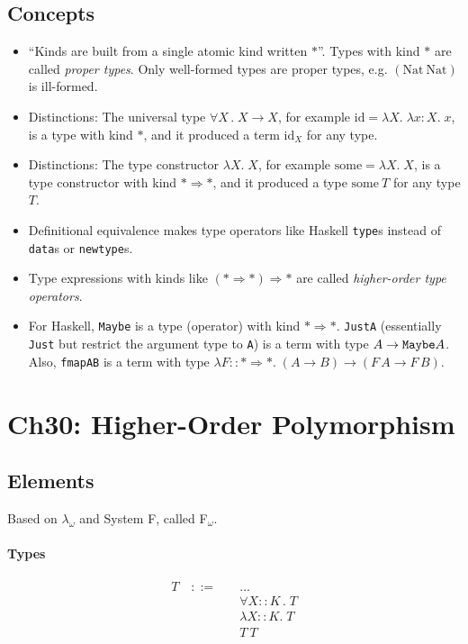 \documentclass{article}
\newcommand{\lam}[2]{\lambda #1 .\;#2}
\newcommand{\lamt}[3]{\lambda #1: #2 .\;#3}
\newcommand{\lamk}[3]{\lambda #1 :: #2 .\;#3}
\newcommand{\uquant}[2]{\forall #1 \, .\; #2}
\begin{document}
\subsection{Concepts}
  \begin{itemize}
    \item ``Kinds are built from a single atomic kind written $*$''.
      Types with kind $*$ are called \emph{proper types}. Only well-formed types are proper types, e.g. $(\mathrm{Nat}~\mathrm{Nat})$ is ill-formed.
    \item Distinctions: The universal type $\uquant{X}{X\to X}$,
      for example $\mathrm{id} = \lam{X}{\lamt{x}{X}{x}}$, is a type with kind $*$,
      and it produced a term $\mathrm{id}_{X}$ for any type.
    \item Distinctions: The type constructor $\lam{X}{X}$,
      for example $\mathrm{some} = \lam{X}{X}$, is a type constructor with kind $* \Rightarrow *$,
      and it produced a type $\mathrm{some}~T$ for any type $T$.
    \item Definitional equivalence makes type operators like Haskell \texttt{type}s instead of \texttt{data}s or \texttt{newtype}s.
    \item Type expressions with kinds like $(* \Rightarrow *)\Rightarrow *$ are called \emph{higher-order type operators}.
    \item For Haskell, \texttt{Maybe} is a type (operator) with kind $*\Rightarrow *$.
        \texttt{JustA} (essentially \texttt{Just} but restrict the argument type to \texttt{A}) is a term with type $A\to \text{\texttt{Maybe}} A$.
        Also, \texttt{fmapAB} is a term with type $\lamk{F}{*\Rightarrow *}{ (A \to B) \to (F\, A\to F\, B) }$.
  \end{itemize}

\section{Ch30: Higher-Order Polymorphism}
\subsection{Elements}
  Based on $\lambda_{\omega}$ and System F, called F$_{\omega}$.

\paragraph{Types}
  \begin{align*}
    T \quad::=\quad & \ldots \tag{function type, type variable} \\
      & \uquant{X::K}{T} \tag{universal type}\\
      & \lamk{X}{K}{T} \tag{operator abstraction}\\
      & T~T \tag{operation application}
  \end{align*}
\end{document}
